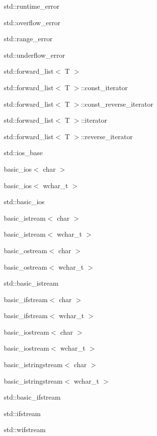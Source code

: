 \begin{DoxyCompactList}
\begin{DoxyCompactList}
\item std\+:\+:runtime\+\_\+error\begin{DoxyCompactList}
\item std\+:\+:overflow\+\_\+error\item std\+:\+:range\+\_\+error\item std\+:\+:underflow\+\_\+error\end{DoxyCompactList}
\end{DoxyCompactList}
\item std\+:\+:forward\+\_\+list$<$ T $>$\item std\+:\+:forward\+\_\+list$<$ T $>$\+:\+:const\+\_\+iterator\item std\+:\+:forward\+\_\+list$<$ T $>$\+:\+:const\+\_\+reverse\+\_\+iterator\item std\+:\+:forward\+\_\+list$<$ T $>$\+:\+:iterator\item std\+:\+:forward\+\_\+list$<$ T $>$\+:\+:reverse\+\_\+iterator\item std\+:\+:ios\+\_\+base\begin{DoxyCompactList}
\item basic\+\_\+ios$<$ char $>$\item basic\+\_\+ios$<$ wchar\+\_\+t $>$\item std\+:\+:basic\+\_\+ios\begin{DoxyCompactList}
\item basic\+\_\+istream$<$ char $>$\item basic\+\_\+istream$<$ wchar\+\_\+t $>$\item basic\+\_\+ostream$<$ char $>$\item basic\+\_\+ostream$<$ wchar\+\_\+t $>$\item std\+:\+:basic\+\_\+istream\begin{DoxyCompactList}
\item basic\+\_\+ifstream$<$ char $>$\item basic\+\_\+ifstream$<$ wchar\+\_\+t $>$\item basic\+\_\+iostream$<$ char $>$\item basic\+\_\+iostream$<$ wchar\+\_\+t $>$\item basic\+\_\+istringstream$<$ char $>$\item basic\+\_\+istringstream$<$ wchar\+\_\+t $>$\item std\+:\+:basic\+\_\+ifstream\begin{DoxyCompactList}
\item std\+:\+:ifstream\item std\+:\+:wifstream\end{DoxyCompactList}

\end{DoxyCompactList}
\end{DoxyCompactList}
\end{DoxyCompactList}
\end{DoxyCompactList}
